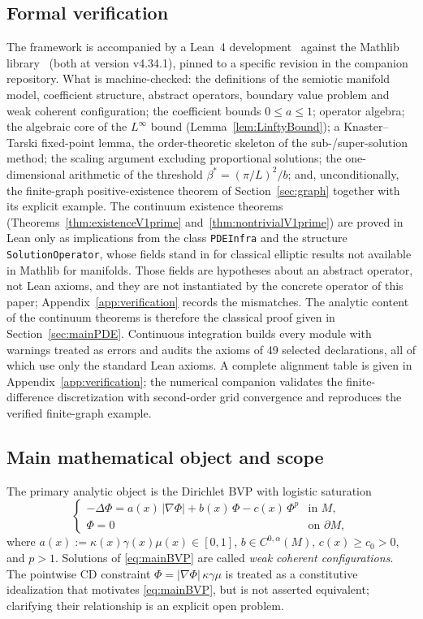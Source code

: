 \documentclass[11pt]{article}
\theoremstyle{plain}
\theoremstyle{definition}
\theoremstyle{remark}
\newcommand{\abs}[1]{\left\lvert #1\right\rvert}
\begin{document}
\subsection*{Formal verification}
The framework is accompanied by a Lean~4 development~\cite{Spence2026Lean} against the Mathlib library~\cite{deMoura2021,Mathlib2020} (both at version v4.34.1), pinned to a specific revision in the companion repository. What is machine-checked: the definitions of the semiotic manifold model, coefficient structure, abstract operators, boundary value problem and weak coherent configuration; the coefficient bounds \(0\le a\le 1\); operator algebra; the algebraic core of the \(L^\infty\) bound (Lemma~\ref{lem:LinftyBound}); a Knaster--Tarski fixed-point lemma, the order-theoretic skeleton of the sub-/super-solution method; the scaling argument excluding proportional solutions; the one-dimensional arithmetic of the threshold \(\beta^*=(\pi/L)^2/b\); and, unconditionally, the finite-graph positive-existence theorem of Section~\ref{sec:graph} together with its explicit example. The continuum existence theorems (Theorems~\ref{thm:existenceV1prime} and~\ref{thm:nontrivialV1prime}) are proved in Lean only as implications from the class \texttt{PDEInfra} and the structure \texttt{SolutionOperator}, whose fields stand in for classical elliptic results not available in Mathlib for manifolds. Those fields are hypotheses about an abstract operator, not Lean axioms, and they are not instantiated by the concrete operator of this paper; Appendix~\ref{app:verification} records the mismatches. The analytic content of the continuum theorems is therefore the classical proof given in Section~\ref{sec:mainPDE}. Continuous integration builds every module with warnings treated as errors and audits the axioms of 49 selected declarations, all of which use only the standard Lean axioms. A complete alignment table is given in Appendix~\ref{app:verification}; the numerical companion validates the finite-difference discretization with second-order grid convergence and reproduces the verified finite-graph example.

\subsection*{Main mathematical object and scope}
The primary analytic object is the Dirichlet BVP with logistic saturation
\begin{equation}\label{eq:mainBVP}
\begin{cases}
-\Delta \Phi = a(x)\,\abs{\nabla \Phi} + b(x)\,\Phi - c(x)\,\Phi^p & \text{in } M,\\
\Phi = 0 & \text{on } \partial M,
\end{cases}
\end{equation}
where \(a(x):=\kappa(x)\gamma(x)\mu(x)\in[0,1]\), \(b\in C^{0,\alpha}(M)\), \(c(x)\ge c_0 > 0\), and \(p>1\).
Solutions of \eqref{eq:mainBVP} are called \emph{weak coherent configurations}. The pointwise CD constraint
\(\Phi=\abs{\nabla\Phi}\,\kappa\gamma\mu\) is treated as a constitutive idealization that motivates \eqref{eq:mainBVP}, but is not asserted equivalent; clarifying their relationship is an explicit open problem.
\end{document}
